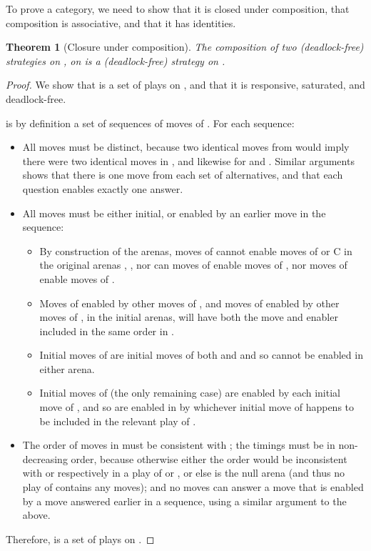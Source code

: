 \documentclass{article}
\newtheorem{theorem}{Theorem}
\begin{document}
To prove  a category, we need to show that it is closed under composition, that composition is associative, and that it has identities.

\begin{theorem}[Closure under composition]
  The composition  of two (deadlock-free) strategies  on ,  on  is a (deadlock-free) strategy on .
\end{theorem}
\begin{proof}
  We show that  is a set of plays on , and that it is responsive, saturated, and deadlock-free.

   is by definition a set of sequences of moves of . For each sequence:
  \begin{itemize}
    \item All moves must be distinct, because two identical moves from  would imply there were two identical moves in , and likewise for  and . Similar arguments shows that there is one move from each set of alternatives, and that each question enables exactly one answer.
    \item All moves must be either initial, or enabled by an earlier move in the sequence: 
      \begin{itemize}
      \item By construction of the arenas, moves of  cannot enable moves of  or C in the original arenas , , nor can moves of  enable moves of , nor moves of  enable moves of .
      \item Moves of  enabled by other moves of , and moves of  enabled by other moves of , in the initial arenas, will have both the move and enabler included in the same order in .
      \item Initial moves of  are initial moves of both  and  and so cannot be enabled in either arena.
      \item Initial moves of  (the only remaining case) are enabled by each initial move of , and so are enabled in  by whichever initial move of  happens to be included in the relevant play of .
      \end{itemize}
    \item The order of moves in  must be consistent with ; the timings must be in non-decreasing order, because otherwise either the order would be inconsistent with  or  respectively in a play of  or , or else  is the null arena (and thus no play of  contains any moves); and no moves can answer a move that is enabled by a move answered earlier in a sequence, using a similar argument to the above.
  \end{itemize}
  Therefore,  is a set of plays on .


\end{proof}
\end{document}
